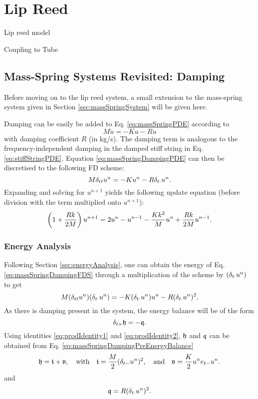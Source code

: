 \chapter{Lip Reed}\label{ch:lipreed}
Lip reed model



Coupling to Tube

\section{Mass-Spring Systems Revisited: Damping}\label{sec:massSpringDamping}
Before moving on to the lip reed system, a small extension to the mass-spring system given in Section \ref{sec:massSpringSystem} will be given here. 

Damping can be easily be added to Eq. \eqref{eq:massSpringPDE} according to 
\begin{equation}\label{eq:massSpringDampingPDE}
    M\ddot u = -Ku - R\dot u
\end{equation}
with damping coefficient $R$ (in kg/s). The damping term is analogous to the frequency-independent damping in the damped stiff string in Eq. \eqref{eq:stiffStringPDE}. Equation \eqref{eq:massSpringDampingPDE} can then be discretised to the following FD scheme:
\begin{equation}\label{eq:massSpringDampingFDS}
    M\delta_{tt} u^n = -Ku^n - R\delta_{t\cdot} u^n.
\end{equation}
Expanding and solving for $u^{n+1}$ yields the following update equation (before division with the term multiplied onto $u^{n+1}$):
\begin{equation}\label{eq:massSpringDampingUpdate}
    \left(1+\frac{Rk}{2M}\right)u^{n+1} = 2 u^n - u^{n-1} - \frac{Kk^2}{M}u^n + \frac{Rk}{2M}u^{n-1}.
\end{equation}
\subsection{Energy Analysis}
Following Section \ref{sec:energyAnalysis}, one can obtain the energy of Eq. \eqref{eq:massSpringDampingFDS} through a multiplication of the scheme by $(\delta_{t\cdot} u^n)$ to get
\begin{equation}\label{eq:massSpringDampingPreEnergyBalance}
    M(\delta_{tt} u^n)(\delta_{t\cdot} u^n) = -K(\delta_{t\cdot} u^n)u^n - R(\delta_{t\cdot} u^n)^2.
\end{equation}
As there is damping present in the system, the energy balance will be of the form 
\begin{equation*}
    \delta_{t+} \mathfrak{h} = -\mathfrak{q}.
\end{equation*}
Using identities \eqref{eq:prodIdentity1} and \eqref{eq:prodIdentity2}, $\mathfrak{h}$ and $\mathfrak{q}$ can be obtained from Eq. \eqref{eq:massSpringDampingPreEnergyBalance} 
\begin{equation}\label{eq:energyBalanceMassSpringDamper}
    \mathfrak{h} = \mathfrak{t} + \mathfrak{v}, \quad \text{with} \quad
    \mathfrak{t} = \frac{M}{2}(\delta_{t-}u^n)^2, \quad \text{and} \quad \mathfrak{v} = \frac{K}{2}u^n e_{t-}u^n.
\end{equation} 
and
\begin{equation}\label{eq:massDampingEnergy}
    \mathfrak{q} = R(\delta_{t\cdot} u^n)^2.
\end{equation}

